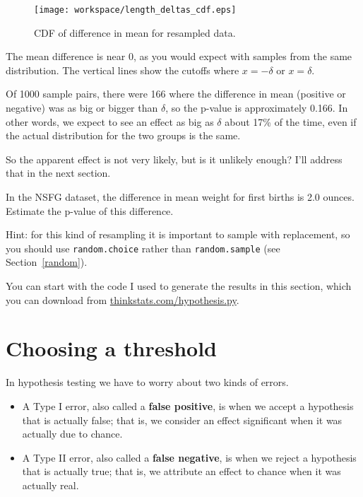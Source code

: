 \documentclass[12pt]{book}
\begin{document}
\begin{figure}
\centerline{\texttt{[image: workspace/length\_deltas\_cdf.eps]}}
\caption{CDF of difference in mean for resampled data.}
\label{length_deltas_cdf}
\end{figure}

The mean difference is near 0, as you would expect with samples
from the same distribution.  The vertical lines show the cutoffs where
$x=-\delta$ or $x=\delta$.

Of 1000 sample pairs, there were 166 where the difference in mean
(positive or negative) was as big or bigger than $\delta$, so the
p-value is approximately 0.166.  In other words, we expect to see an
effect as big as $\delta$ about 17\% of the time, even if the actual
distribution for the two groups is the same.

So the apparent effect is not very likely, but is it unlikely enough?
I'll address that in the next section.

\begin{ex}

In the NSFG dataset, the difference in mean weight for first
births is 2.0 ounces.  Estimate the p-value of this difference.


Hint: for this kind of resampling it is important to sample
with replacement, so you should use {\tt random.choice} rather
than {\tt random.sample} (see Section~\ref{random}).


You can start with the code I used to generate the results in this
section, which you can download from \url{thinkstats.com/hypothesis.py}.


\end{ex}


\section{Choosing a threshold}
\label{threshold}

In hypothesis testing we have to worry about two kinds of errors.


\begin{itemize}

\item A Type I error, also called a {\bf false positive}, is when we
  accept a hypothesis that is actually false; that is, we consider an
  effect significant when it was actually due to chance.

\item A Type II error, also called a {\bf false negative}, is when we
  reject a hypothesis that is actually true; that is, we attribute an
  effect to chance when it was actually real.

\end{itemize}
\end{document}
